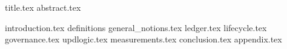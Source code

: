 \documentclass{llncs}
\begin{document}
{title.tex}
{abstract.tex}

{introduction.tex}
{definitions}
{general_notions.tex}
{ledger.tex}
{lifecycle.tex}
{governance.tex}
{updlogic.tex}
{measurements.tex}
{conclusion.tex}
{appendix.tex}




\end{document}
